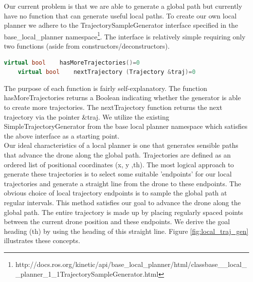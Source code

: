 \documentclass[capstone_report.tex]{subfiles}
\begin{document}
Our current problem is that we are able to generate a global path but currently have no function that can generate useful local paths.  To create our own local planner we adhere to the TrajectorySampleGenerator interface specified in the base\_local\_planner namespace\footnote{http://docs.ros.org/kinetic/api/base\_local\_planner/html/classbase\_\_local\_\_planner\_1\_1TrajectorySampleGenerator.html}.   The interface is relatively simple requiring only two functions (aside from constructors/deconstructors).

\begin{lstlisting}[language=c++]
    virtual bool    hasMoreTrajectories()=0
    virtual bool    nextTrajectory (Trajectory &traj)=0
\end{lstlisting}

The purpose of each function is fairly self-explanatory.  The function hasMoreTrajectories returns a Boolean indicating whether the generator is able to create more trajectories. The nextTrajectory function returns the next trajectory via the pointer \&traj.  We utilize the existing SimpleTrajectoryGenerator from the base local planner namespace which satisfies the above interface as a starting point.\\

Our ideal characteristics of a local planner is one that generates sensible paths that advance the drone along the global path.  Trajectories are defined as an ordered list of positional coordinates (x, y ,th).  The most logical approach to generate these trajectories is to select some suitable 'endpoints' for our local trajectories and generate a straight line from the drone to these endpoints.  The obvious choice of local trajectory endpoints is to sample the global path at regular intervals.  This method satisfies our goal to advance the drone along the global path.  The entire trajectory is made up by placing regularly spaced points between the current drone position and these endpoints.  We derive the goal heading (th) by using the heading of this straight line.  Figure \ref{fig:local_traj_gen} illustrates these concepts.
\end{document}

